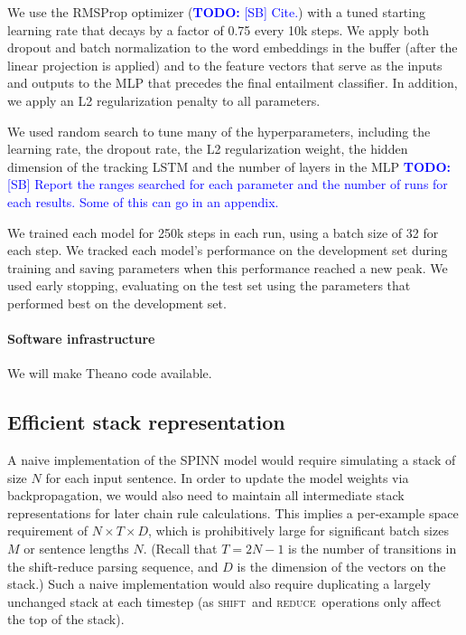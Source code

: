 \documentclass[11pt]{article}
\newcommand\todo[1]{\textcolor{blue}{\textbf{TODO:} #1}}
\newcommand{\shift}{\textsc{shift}}
\newcommand{\reduce}{\textsc{reduce}}
\begin{document}
We use the RMSProp optimizer (\todo{[SB] Cite.}) with a tuned starting learning rate that decays by a factor of 0.75 every 10k steps. We apply both dropout \citep{srivastava2014dropout} and batch normalization \citep{2015SIoffeCSzegedy} to the word embeddings in the buffer (after the linear projection is applied) and to the feature vectors that serve as the inputs and outputs to the MLP that precedes the final entailment classifier. In addition, we apply an L2 regularization penalty to all parameters.

We used random search to tune many of the hyperparameters, including the learning rate, the dropout rate, the L2 regularization weight, the hidden dimension of the tracking LSTM and the number of layers in the MLP \todo{[SB] Report the ranges searched for each parameter and the number of runs for each results. Some of this can go in an appendix.}

We trained each model for 250k steps in each run, using a batch size of 32 for each step. We tracked each model's performance on the development set during training and saving parameters when this performance reached a new peak. We used early stopping, evaluating on the test set using the parameters that performed best on the development set.

\paragraph{Software infrastructure} We will make Theano code available.

\subsection{Efficient stack representation}

A naive implementation of the SPINN model would require simulating a stack of size $N$ for each input sentence. In order to update the model weights via backpropagation, we would also need to maintain all intermediate stack representations for later chain rule calculations. This implies a per-example space requirement of $N \times T \times D$, which is prohibitively large for significant batch sizes $M$ or sentence lengths $N$. (Recall that $T = 2N - 1$ is the number of transitions in the shift-reduce parsing sequence, and $D$ is the dimension of the vectors on the stack.) Such a naive implementation would also require duplicating a largely unchanged stack at each timestep (as \shift~and \reduce~operations only affect the top of the stack).
\end{document}
